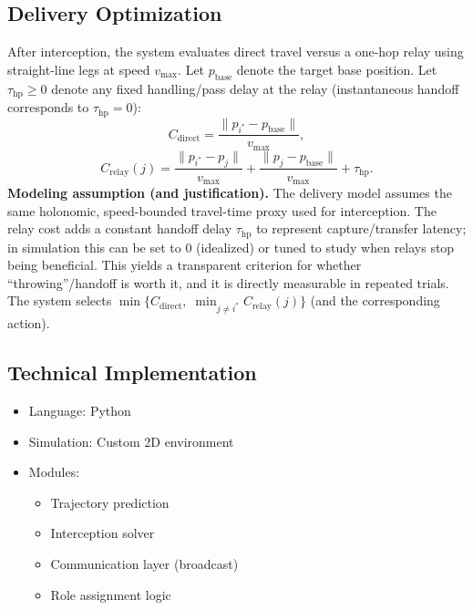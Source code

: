 \documentclass[conference]{IEEEtran}
\begin{document}
\subsection{Delivery Optimization}

After interception, the system evaluates direct travel versus a one-hop relay using straight-line legs at speed $v_{\max}$. Let $p_{\mathrm{base}}$ denote the target base position. Let $\tau_{\mathrm{hp}} \ge 0$ denote any fixed handling/pass delay at the relay (instantaneous handoff corresponds to $\tau_{\mathrm{hp}} = 0$):
\begin{equation}
C_{\mathrm{direct}} = \frac{\|p_{i^\ast} - p_{\mathrm{base}}\|}{v_{\max}} ,
\end{equation}
\begin{equation}
C_{\mathrm{relay}}(j) = \frac{\|p_{i^\ast} - p_j\|}{v_{\max}} + \frac{\|p_j - p_{\mathrm{base}}\|}{v_{\max}} + \tau_{\mathrm{hp}} .
\end{equation}
\noindent\textbf{Modeling assumption (and justification).} The delivery model assumes the same holonomic, speed-bounded travel-time proxy used for interception. The relay cost adds a constant handoff delay \(\tau_{\mathrm{hp}}\) to represent capture/transfer latency; in simulation this can be set to \(0\) (idealized) or tuned to study when relays stop being beneficial. This yields a transparent criterion for whether ``throwing''/handoff is worth it, and it is directly measurable in repeated trials.
\noindent The system selects $\min\bigl\{ C_{\mathrm{direct}},\; \min_{j \ne i^\ast} C_{\mathrm{relay}}(j) \bigr\}$ (and the corresponding action).

\subsection{Technical Implementation}

\begin{itemize}
    \item Language: Python
    \item Simulation: Custom 2D environment
    \item Modules:
    \begin{itemize}
        \item Trajectory prediction
        \item Interception solver
        \item Communication layer (broadcast)
        \item Role assignment logic
    \end{itemize}
\end{itemize}
\end{document}
